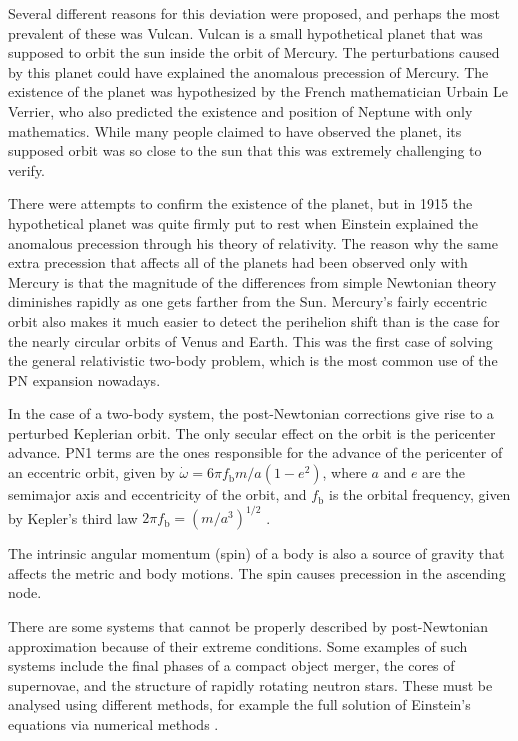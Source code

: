 \documentclass[english, oneside]{HYgradu}
\begin{document}
Several different reasons for this deviation were proposed, and perhaps the most prevalent of these was Vulcan. Vulcan is a small hypothetical planet that was supposed to orbit the sun inside the orbit of Mercury. The perturbations caused by this planet could have explained the anomalous precession of Mercury. The existence of the planet was hypothesized by the French mathematician Urbain Le Verrier, who also predicted the existence and position of Neptune with only mathematics. While many people claimed to have observed the planet, its supposed orbit was so close to the sun that this was extremely challenging to verify.

There were attempts to confirm the existence of the planet, but in 1915 the hypothetical planet was quite firmly put to rest when Einstein explained the anomalous precession through his theory of relativity. The reason why the same extra precession that affects all of the planets had been observed only with Mercury is that the magnitude of the differences from simple Newtonian theory diminishes rapidly as one gets farther from the Sun. Mercury's fairly eccentric orbit also makes it much easier to detect the perihelion shift than is the case for the nearly circular orbits of Venus and Earth.
This was the first case of solving the general relativistic two-body problem, which is the most common use of the PN expansion nowadays. %


In the case of a two-body system, the post-Newtonian corrections give rise to a perturbed Keplerian orbit. The only secular effect on the orbit is the pericenter advance.
PN1 terms are the ones responsible for the advance of the pericenter of an eccentric orbit, given by $\dot{\omega} = 6 \pi f_\mathrm{b} m/a (1-e^2)$, where $a$ and $e$ are the semimajor axis and eccentricity of the orbit, and $f_\mathrm{b}$ is the orbital frequency, given by Kepler's third law $2 \pi f_\mathrm{b} = (m/a^3)^{1/2}$ \citep{will:2006}. 

The intrinsic angular momentum (spin) of a body is also a source of gravity that affects the metric and body motions. The spin causes precession in the ascending node. %

There are some systems that cannot be properly described by post-Newtonian approximation because of their extreme conditions. Some examples of such systems include the final phases of a compact object merger, the cores of supernovae, and the structure of rapidly rotating neutron stars. These must be analysed using different methods, for example the full solution of Einstein's equations via numerical methods \citep{will:2006}. 
\end{document}
